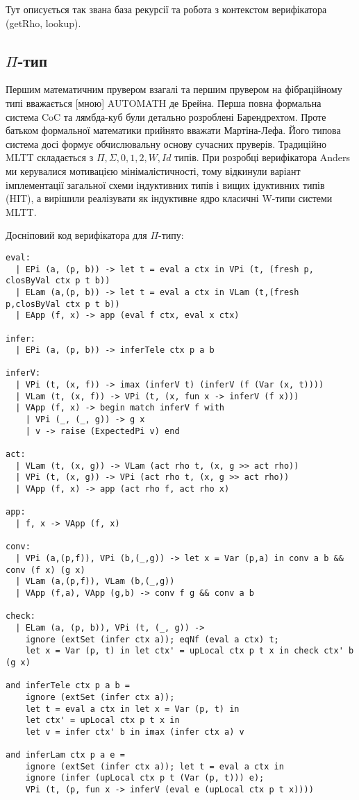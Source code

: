 Тут описується так звана база рекурсії та робота з
контекстом верифікатора (getRho, lookup).

\subsection*{$\Pi$-тип}

Першим математичним прувером взагалі та першим прувером
на фібраційному типі вважається [мною] AUTOMATH де Брейна. Перша
повна формальна система CoC та лямбда-куб були детально розроблені
Барендрехтом. Проте батьком формальної математики прийнято вважати
Мартіна-Лефа. Його типова система досі формує обчислювальну основу
сучасних пруверів. Традиційно MLTT складається з $\Pi, \Sigma, 0, 1, 2, W, Id$ типів.
При розробці верифікатора Anders ми керувалися мотивацією мінімалістичності,
тому відкинули варіант імплементації загальної схеми індуктивних типів і
вищих ідуктивних типів (HIT), а вирішили реалізувати як індуктивне
ядро класичні W-типи системи MLTT.

\newpage
Досніповий код верифікатора для $\Pi$-типу:
\begin{lstlisting}
eval:
  | EPi (a, (p, b)) -> let t = eval a ctx in VPi (t, (fresh p, closByVal ctx p t b))
  | ELam (a,(p, b)) -> let t = eval a ctx in VLam (t,(fresh p,closByVal ctx p t b))
  | EApp (f, x) -> app (eval f ctx, eval x ctx)

infer:
  | EPi (a, (p, b)) -> inferTele ctx p a b

inferV:
  | VPi (t, (x, f)) -> imax (inferV t) (inferV (f (Var (x, t))))
  | VLam (t, (x, f)) -> VPi (t, (x, fun x -> inferV (f x)))
  | VApp (f, x) -> begin match inferV f with
    | VPi (_, (_, g)) -> g x
    | v -> raise (ExpectedPi v) end

act:
  | VLam (t, (x, g)) -> VLam (act rho t, (x, g >> act rho))
  | VPi (t, (x, g)) -> VPi (act rho t, (x, g >> act rho))
  | VApp (f, x) -> app (act rho f, act rho x)

app:
  | f, x -> VApp (f, x)

conv:
  | VPi (a,(p,f)), VPi (b,(_,g)) -> let x = Var (p,a) in conv a b && conv (f x) (g x)
  | VLam (a,(p,f)), VLam (b,(_,g))
  | VApp (f,a), VApp (g,b) -> conv f g && conv a b
  
check:
  | ELam (a, (p, b)), VPi (t, (_, g)) ->
    ignore (extSet (infer ctx a)); eqNf (eval a ctx) t;
    let x = Var (p, t) in let ctx' = upLocal ctx p t x in check ctx' b (g x)

and inferTele ctx p a b =
    ignore (extSet (infer ctx a));
    let t = eval a ctx in let x = Var (p, t) in
    let ctx' = upLocal ctx p t x in
    let v = infer ctx' b in imax (infer ctx a) v
  
and inferLam ctx p a e =
    ignore (extSet (infer ctx a)); let t = eval a ctx in
    ignore (infer (upLocal ctx p t (Var (p, t))) e);
    VPi (t, (p, fun x -> inferV (eval e (upLocal ctx p t x))))
\end{lstlisting}

